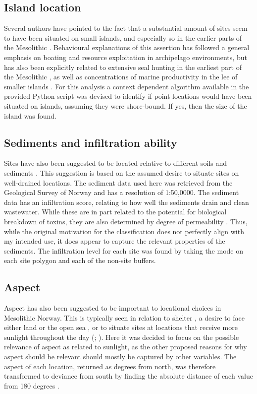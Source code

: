 \documentclass[12pt, a4paper]{article}
\begin{document}
\subsection{Island location}
Several authors have pointed to the fact that a substantial amount of sites seem to have been situated on small islands, and especially so in the earlier parts of the Mesolithic \citep[e.g.][]{nyland2012, bjerck2013, bjerck2017}. Behavioural explanations of this assertion has followed a general emphasis on boating and resource exploitation in archipelago environments, but has also been explicitly related to extensive seal hunting in the earliest part of the Mesolithic \citep{bjerck2017}, as well as concentrations of marine productivity in the lee of smaller islands \citep{breivik2014,schmitt2015}. For this analysis a context dependent algorithm available in the provided Python script was devised to identify if point locations would have been situated on islands, assuming they were shore-bound. If yes, then the size of the island was found.

\subsection{Sediments and infiltration ability}
Sites have also been suggested to be located relative to different soils and sediments \citep[][]{bergsvik1995, berghansen2009}. This suggestion is based on the assumed desire to situate sites on well-drained locations. The sediment data used here was retrieved from the Geological Survey of Norway and has a resolution of 1:50,0000. The sediment data has an infiltration score, relating to how well the sediments drain and clean wastewater. While these are in part related to the potential for biological breakdown of toxins, they are also determined by degree of permeability \citep{ngu2015}. Thus, while the original motivation for the classification does not perfectly align with my intended use, it does appear to capture the relevant properties of the sediments. The infiltration level for each site was found by taking the mode on each site polygon and each of the non-site buffers. 

\subsection{Aspect}
Aspect has also been suggested to be important to locational choices in Mesolithic Norway. This is typically seen in relation to shelter \citep[][47]{berghansen2009}, a desire to face either land or the open sea \citep{darmark2018}, or to situate sites at locations that receive more sunlight throughout the day (\citealp[][58]{mikkelsen1989}; \citealp[][113]{berghansen2009}). Here it was decided to focus on the possible relevance of aspect as related to sunlight, as the other proposed reasons for why aspect should be relevant should mostly be captured by other variables. The aspect of each location, returned as degrees from north, was therefore transformed to deviance from south by finding the absolute distance of each value from 180 degrees \citep[][]{spencer2018}. 
\end{document}
